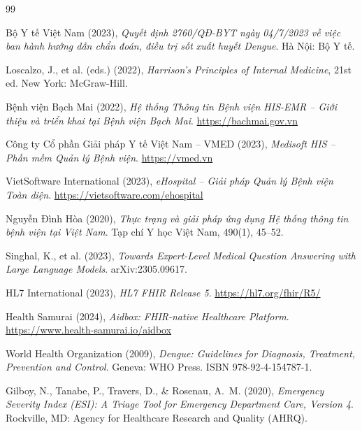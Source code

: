 \documentclass[a4paper,13pt,3p,twoside,openany]{report}
\theoremstyle{definition}
\theoremstyle{remark}
\theoremstyle{definition}
\renewcommand{\bibname}{Tài liệu tham khảo}
\begin{document}
\newpage
\renewcommand\bibname{TÀI LIỆU THAM KHẢO}
\begin{thebibliography}{99}

 Bộ Y tế Việt Nam (2023), \textit{Quyết định 2760/QĐ-BYT ngày 04/7/2023 về việc ban hành hướng dẫn chẩn đoán, điều trị sốt xuất huyết Dengue}. Hà Nội: Bộ Y tế.

 Loscalzo, J., et al. (eds.) (2022), \textit{Harrison's Principles of Internal Medicine}, 21st ed. New York: McGraw-Hill.

 Bệnh viện Bạch Mai (2022), \textit{Hệ thống Thông tin Bệnh viện HIS-EMR -- Giới thiệu và triển khai tại Bệnh viện Bạch Mai}. \url{https://bachmai.gov.vn}

 Công ty Cổ phần Giải pháp Y tế Việt Nam -- VMED (2023), \textit{Medisoft HIS -- Phần mềm Quản lý Bệnh viện}. \url{https://vmed.vn}

 VietSoftware International (2023), \textit{eHospital -- Giải pháp Quản lý Bệnh viện Toàn diện}. \url{https://vietsoftware.com/ehospital}

 Nguyễn Đình Hòa (2020), \textit{Thực trạng và giải pháp ứng dụng Hệ thống thông tin bệnh viện tại Việt Nam}. Tạp chí Y học Việt Nam, 490(1), 45--52.

 Singhal, K., et al. (2023), \textit{Towards Expert-Level Medical Question Answering with Large Language Models}. arXiv:2305.09617.

 HL7 International (2023), \textit{HL7 FHIR Release 5}. \url{https://hl7.org/fhir/R5/}

 Health Samurai (2024), \textit{Aidbox: FHIR-native Healthcare Platform}. \url{https://www.health-samurai.io/aidbox}

 World Health Organization (2009), \textit{Dengue: Guidelines for Diagnosis, Treatment, Prevention and Control}. Geneva: WHO Press. ISBN 978-92-4-154787-1.

 Gilboy, N., Tanabe, P., Travers, D., \& Rosenau, A.~M. (2020), \textit{Emergency Severity Index (ESI): A Triage Tool for Emergency Department Care, Version 4}. Rockville, MD: Agency for Healthcare Research and Quality (AHRQ).


\end{thebibliography}
\end{document}
